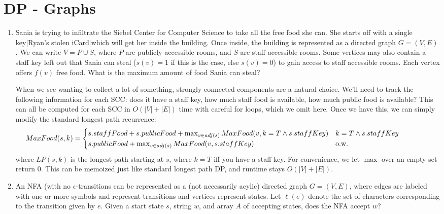 \documentclass[fleqn]{article}
\begin{document}
\section{DP - Graphs}
\begin{enumerate}
    \item Sania is trying to infiltrate the Siebel Center for Computer Science to take all the free food she can. She starts off with a single key|Ryan's stolen iCard|which will get her inside the building. Once inside, the building is represented as a directed graph $G = (V, E)$. We can write $V = P \cup S$, where $P$ are publicly accessible rooms, and $S$ are staff accessible rooms. Some vertices may also contain a staff key left out that Sania can steal ($s(v) = 1$ if this is the case, else $s(v) = 0$) to gain access to staff accessible rooms. Each vertex offers $f(v)$ free food. What is the maximum amount of food Sania can steal?
    \begin{answer}
        When we see wanting to collect a lot of something, strongly connected components are a natural choice. We'll need to track the following information for each SCC: does it have a staff key, how much staff food is available, how much public food is available? This can all be computed for each SCC in $O(|V| + |E|)$ time with careful for loops, which we omit here. Once we have this, we can simply modify the standard longest path recurrence:
        \[
            \mkern-75mu MaxFood(s, k) = \begin{cases}
               s.staffFood + s.publicFood + \max_{v \in adj(s)}MaxFood(v, k = T \wedge s.staffKey) & k = T \wedge s.staffKey \\
               s.publicFood + \max_{v \in adj(s)}MaxFood(v, s.staffKey) & \text{o.w.}
            \end{cases}
        \]
        where $LP(s,k)$ is the longest path starting at $s$, where $k=T$ iff you have a staff key. For convenience, we let $\max$ over an empty set return $0$. This can be memoized just like standard longest path DP, and runtime stays $O(|V| + |E|)$.
    \end{answer}
    \item An NFA (with no $\epsilon$-transitions can be represented as a (not necessarily acylic) directed graph $G = (V, E)$, where edges are labeled with one or more symbols and represent transitions and vertices represent states. Let $\ell(e)$ denote the set of characters corresponding to the transition given by $e$. Given a start state $s$, string $w$, and array $A$ of accepting states, does the NFA accept $w$?

\end{enumerate}
\end{document}
